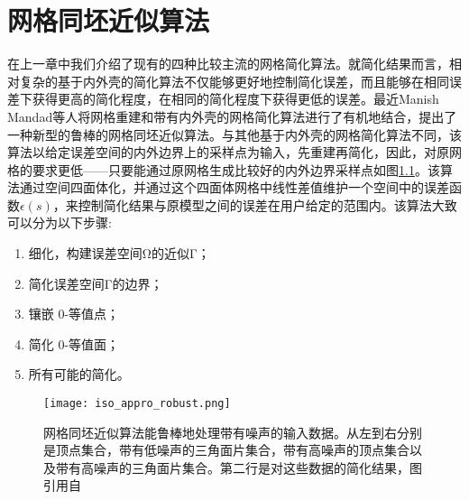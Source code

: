
\chapter{网格同坯近似算法}
在上一章中我们介绍了现有的四种比较主流的网格简化算法。就简化结果而言，相对复杂的基于内外壳的简化算法不仅能够更好地控制简化误差，而且能够在相同误差下获得更高的简化程度，在相同的简化程度下获得更低的误差。最近Manish Mandad等人将网格重建和带有内外壳的网格简化算法进行了有机地结合，提出了一种新型的鲁棒的网格同坯近似算法\cite{isotopic-appro}。与其他基于内外壳的网格简化算法不同，该算法以给定误差空间的内外边界上的采样点为输入，先重建再简化，因此，对原网格的要求更低——只要能通过原网格生成比较好的内外边界采样点如图\ref{fig:iso-appro-robust}。该算法通过空间四面体化，并通过这个四面体网格中线性差值维护一个空间中的误差函数$\epsilon(s)$，来控制简化结果与原模型之间的误差在用户给定的范围内。该算法大致可以分为以下步骤:
\begin{enumerate}[（1）]
  \item 细化，构建误差空间Ω的近似Γ；
  \item 简化误差空间Γ的边界；
  \item 镶嵌 0-等值点；
  \item 简化 0-等值面；
  \item 所有可能的简化。
\end{enumerate}
\begin{figure}[htbp]
    \centering
    \texttt{[image: iso\_appro\_robust.png]}
    \caption[同坯近似算法鲁棒性]{网格同坯近似算法能鲁棒地处理带有噪声的输入数据。从左到右分别是顶点集合，带有低噪声的三角面片集合，带有高噪声的顶点集合以及带有高噪声的三角面片集合。第二行是对这些数据的简化结果，图引用自\cite{isotopic-appro}}
    \label{fig:iso-appro-robust}
\end{figure}

